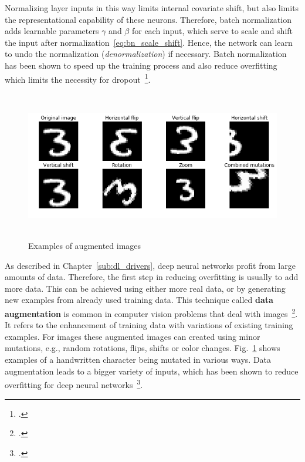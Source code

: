 Normalizing layer inputs in this way limits internal covariate shift, but also
limits the representational capability of these neurons.
Therefore, batch normalization adds learnable parameters $\gamma$ and $\beta$ for
each input, which serve to scale and shift the input after normalization~\ref{eq:bn_scale_shift}.
Hence, the network can learn to undo the normalization (\textit{denormalization})
if necessary.
Batch normalization has been shown to speed up the training process and also
reduce overfitting which limits the necessity for dropout~\footcite{Ioffe2015}.

\begin{figure}[h]
  \includegraphics[height=6.5cm]{img/data_augmentation}
  \caption{Examples of augmented images}
\label{fig:augmented_images}
\end{figure}

As described in Chapter~\ref{sub:dl_drivers}, deep neural networks profit from
large amounts of data.
Therefore, the first step in reducing overfitting is usually to add
more data.
This can be achieved using either more real data, or by generating new examples
from already used training data.
This technique called \textbf{data augmentation} is common in computer vision
problems that deal with images~\footcite{Simard2003}.
It refers to the enhancement of training data with variations of existing training
examples.
For images these augmented images can created using minor mutations, e.g., random rotations, flips, shifts or
color changes.
Fig.~\ref{fig:augmented_images} shows examples of a handwritten character being
mutated in various ways.
Data augmentation leads to a bigger variety of inputs, which has been shown
to reduce overfitting for deep neural networks~\footcite{Krizhevsky2012}.

